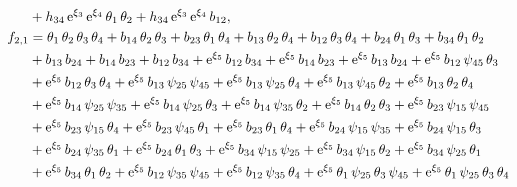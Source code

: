 \documentclass[12pt,a4paper,UTF8]{article}
\numberwithin{equation}{section}
\begin{document}
\begin{equation*}
\begin{aligned}
&+{{h}_{34}}\,{\rm e}^{{{\xi}_{3}}}\,{\rm e}^{{{\xi}_{4}}}\,{{\theta}_{1}}\,{{\theta}_{2}}+{{h}_{34}}\,{\rm e}^{{{\xi}_{3}}}\,{\rm e}^{{{\xi}_{4}}}\,{{b}_{12}} ,\\ 
f_{2,1}&={{\theta}_{1}}\,{{\theta}_{2}}\,{{\theta}_{3}}\,{{\theta}_{4}}+{{b}_{14}}\,{{\theta}_{2}}\,{{\theta}_{3}}+{{b}_{23}}\,{{\theta}_{1}}\,{{\theta}_{4}}+{{b}_{13}}\,{{\theta}_{2}}\,{{\theta}_{4}}+{{b}_{12}}\,{{\theta}_{3}}\,{{\theta}_{4}}+{{b}_{24}}\,{{\theta}_{1}}\,{{\theta}_{3}}+{{b}_{34}}\,{{\theta}_{1}}\,{{\theta}_{2}}\\
&+{{b}_{13}}\,{{b}_{24}}+{{b}_{14}}\,{{b}_{23}}+{{b}_{12}}\,{{b}_{34}}+{\rm e}^{{{\xi}_{5}}}\,{{b}_{12}}\,{{b}_{34}}+{\rm e}^{{{\xi}_{5}}}\,{{b}_{14}}\,{{b}_{23}}+{\rm e}^{{{\xi}_{5}}}\,{{b}_{13}}\,{{b}_{24}}+{\rm e}^{{{\xi}_{5}}}\,{{b}_{12}}\,{{\psi}_{45}}\,{{\theta}_{3}}\\
&+{\rm e}^{{{\xi}_{5}}}\,{{b}_{12}}\,{{\theta}_{3}}\,{{\theta}_{4}}+{\rm e}^{{{\xi}_{5}}}\,{{b}_{13}}\,{{\psi}_{25}}\,{{\psi}_{45}}+{\rm e}^{{{\xi}_{5}}}\,{{b}_{13}}\,{{\psi}_{25}}\,{{\theta}_{4}}+{\rm e}^{{{\xi}_{5}}}\,{{b}_{13}}\,{{\psi}_{45}}\,{{\theta}_{2}}+{\rm e}^{{{\xi}_{5}}}\,{{b}_{13}}\,{{\theta}_{2}}\,{{\theta}_{4}}\\
&+{\rm e}^{{{\xi}_{5}}}\,{{b}_{14}}\,{{\psi}_{25}}\,{{\psi}_{35}}+{\rm e}^{{{\xi}_{5}}}\,{{b}_{14}}\,{{\psi}_{25}}\,{{\theta}_{3}}+{\rm e}^{{{\xi}_{5}}}\,{{b}_{14}}\,{{\psi}_{35}}\,{{\theta}_{2}}+{\rm e}^{{{\xi}_{5}}}\,{{b}_{14}}\,{{\theta}_{2}}\,{{\theta}_{3}}+{\rm e}^{{{\xi}_{5}}}\,{{b}_{23}}\,{{\psi}_{15}}\,{{\psi}_{45}}\\
&+{\rm e}^{{{\xi}_{5}}}\,{{b}_{23}}\,{{\psi}_{15}}\,{{\theta}_{4}}+{\rm e}^{{{\xi}_{5}}}\,{{b}_{23}}\,{{\psi}_{45}}\,{{\theta}_{1}}+{\rm e}^{{{\xi}_{5}}}\,{{b}_{23}}\,{{\theta}_{1}}\,{{\theta}_{4}}+{\rm e}^{{{\xi}_{5}}}\,{{b}_{24}}\,{{\psi}_{15}}\,{{\psi}_{35}}+{\rm e}^{{{\xi}_{5}}}\,{{b}_{24}}\,{{\psi}_{15}}\,{{\theta}_{3}}\\
&+{\rm e}^{{{\xi}_{5}}}\,{{b}_{24}}\,{{\psi}_{35}}\,{{\theta}_{1}}+{\rm e}^{{{\xi}_{5}}}\,{{b}_{24}}\,{{\theta}_{1}}\,{{\theta}_{3}}+{\rm e}^{{{\xi}_{5}}}\,{{b}_{34}}\,{{\psi}_{15}}\,{{\psi}_{25}}+{\rm e}^{{{\xi}_{5}}}\,{{b}_{34}}\,{{\psi}_{15}}\,{{\theta}_{2}}+{\rm e}^{{{\xi}_{5}}}\,{{b}_{34}}\,{{\psi}_{25}}\,{{\theta}_{1}}\\
&+{\rm e}^{{{\xi}_{5}}}\,{{b}_{34}}\,{{\theta}_{1}}\,{{\theta}_{2}}+{\rm e}^{{{\xi}_{5}}}\,{{b}_{12}}\,{{\psi}_{35}}\,{{\psi}_{45}}+{\rm e}^{{{\xi}_{5}}}\,{{b}_{12}}\,{{\psi}_{35}}\,{{\theta}_{4}}+{\rm e}^{{{\xi}_{5}}}\,{{\theta}_{1}}\,{{\psi}_{25}}\,{{\theta}_{3}}\,{{\psi}_{45}}+{\rm e}^{{{\xi}_{5}}}\,{{\theta}_{1}}\,{{\psi}_{25}}\,{{\theta}_{3}}\,{{\theta}_{4}}\\

\end{aligned}
\end{equation*}
\end{document}
